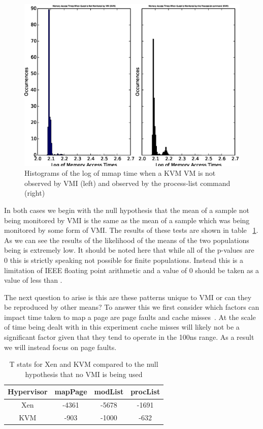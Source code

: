 	\begin{figure}[ht]\label{KVMMMapHist1}
	  \centering
	  \includegraphics[width=\textwidth]{figures/KVMMMApTestNoVMIvsProcList.eps}
	  \caption{Histograms of the log of mmap time when a KVM VM is not observed by VMI (left) and observed by the process-list command (right)}
	\end{figure}

In both cases we begin with the null hypothesis that the mean of a sample not being monitored by VMI is the same as the mean of a sample which was being monitored by some form of VMI. The results of these tests are shown in table ~\ref{TStatsMMap1}. 
As we can see the results of the likelihood of the means of the two populations being is extremely low. It should be noted here that while all of the p-values are 0 this is strictly speaking not possible for finite populations. Instead this is a limitation of IEEE floating point arithmetic and a value of 0 should be taken as a value of less than  . 


The next question to arise is this are these patterns unique to VMI or can they be reproduced by other means? To answer this we first consider which factors can impact time taken to map a page are page faults and cache misses~\cite{bryant_computer_2003}.  At the scale of time being dealt with in this experiment cache misses will likely not be a significant factor given that they tend to operate in the 100ns range. As a result we will instead focus on page faults. 


	\begin{table}
		\centering
		\begin{tabular}{| c | c | c | c |}
			\hline
			Hypervisor & mapPage & modList & procList  \\ \hline
			Xen & -4361 & -5678 & -1691  \\  \hline
			KVM & -903 & -1000 & -632  \\ \hline

		\end{tabular}
		\label{TStatsMMap1}
		\caption{T stats for Xen and KVM compared to the null hypothesis that no VMI is being used}
	\end{table}



